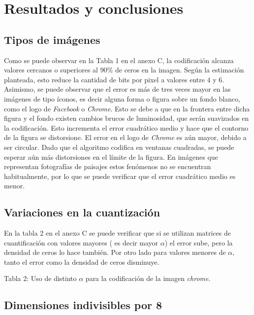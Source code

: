 \documentclass[%
	final,
	reprint,
	notitlepage,
	narroweqnarray,
	inline,
	twoside,
	invited
	]{ieee}
\begin{document}
\section{Resultados y conclusiones}

\subsection{Tipos de imágenes}

\par Como se puede observar en la Tabla 1 en el anexo C, la codificación alcanza valores cercanos o superiores al $90\%$ de 
ceros en la imagen. Según la estimación planteada, esto reduce la cantidad de bits por pixel 
 a valores entre $4$ y $6$. Asimismo, se puede observar que el error es más de tres veces mayor en las imágenes de tipo 
íconos, es decir alguna forma o figura sobre un fondo blanco, como el logo de \textit{Facebook} o \textit{Chrome}.
 Esto se debe a que en la frontera entre dicha figura y el fondo existen cambios brucos de luminosidad, 
 que serán suavizados en la codificación. Esto incrementa el error cuadrático medio y hace que 
 el contorno de la figura se distorsione. El error en el logo de \textit{Chrome} es aún mayor, debido a ser  
 circular. Dado que el algoritmo codifica en ventanas cuadradas, se puede esperar aún más distorsiones 
 en el límite de la figura. En imágenes que representan fotografías de paisajes estos fenómenos no se 
 encuentran habitualmente, por lo que se puede verificar que el error cuadrático medio es menor.



\subsection{Variaciones en la cuantización}

\par En la tabla 2 en el anexo C se puede verificar que si se utilizan matrices de cuantificación con valores mayores 
( es decir mayor $\alpha$) el error sube, pero la densidad de ceros lo hace también. Por otro lado para 
valores menores de $\alpha$, tanto el error como la densidad de ceros disminuye.



\begin{center}
Tabla 2: Uso de distinto $\alpha$ para la codificación de la imagen \textit{chrome}.
\end{center}

\subsection{Dimensiones indivisibles por 8}
\end{document}
